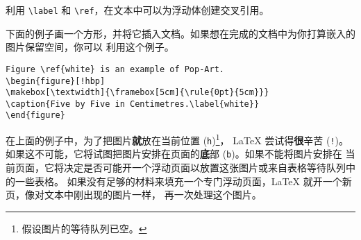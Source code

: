 利用 \verb|\label| 和 \verb|\ref|，在文本中可以为浮动体创建交叉引用。

下面的例子画一个方形，并将它插入文档。如果想在完成的文档中为你打算嵌入的图片保留空间，你可以
利用这个例子。

\begin{code}
\begin{verbatim}
Figure \ref{white} is an example of Pop-Art.
\begin{figure}[!hbp]
\makebox[\textwidth]{\framebox[5cm]{\rule{0pt}{5cm}}}
\caption{Five by Five in Centimetres.\label{white}}
\end{figure}
\end{verbatim}
\end{code}

\noindent 在上面的例子中，为了把图片{\textbf
就放在当前位置} (\texttt{h})\footnote{假设图片的等待队列已空。}，
\LaTeX{} 尝试得{\textbf 很辛苦} (\texttt{!})。
如果这不可能，它将试图把图片安排在页面的{\textbf
底部} (\texttt{b})。如果不能将图片安排在
当前页面，它将决定是否可能开一个浮动页面以放置这张图片或来自表格等待队列中的一些表格。
如果没有足够的材料来填充一个专门浮动页面，\LaTeX{} 就开一个新页，像对文本中刚出现的图片一样，
再一次处理这个图片。

